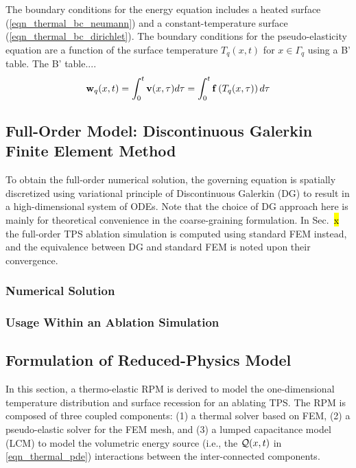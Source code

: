 The boundary conditions for the energy equation includes a heated surface (\cref{eqn_thermal_bc_neumann}) and a constant-temperature surface (\cref{eqn_thermal_bc_dirichlet}). The boundary conditions for the pseudo-elasticity equation are a function of the surface temperature $T_q(x,t)$ for $x\in\Gamma_q$ using a B' table. The B' table....
\begin{equation}
    \mathbf{w}_q(x,t) = \int_{0}^{t} \mathbf{v}(x,\tau)d\tau = \int_{0}^{t}\mathbf{f}\left(T_q(x,\tau)\right)d\tau
\end{equation}


\subsection{Full-Order Model: Discontinuous Galerkin Finite Element Method}

To obtain the full-order numerical solution, the governing equation is spatially discretized using variational principle of Discontinuous Galerkin (DG) to result in a high-dimensional system of ODEs. Note that the choice of DG approach here is mainly for theoretical convenience in the coarse-graining formulation. In Sec.~\hl{x} the full-order TPS ablation simulation is computed using standard FEM instead, and the equivalence between DG and standard FEM is noted upon their convergence.

\subsubsection{Numerical Solution}

\subsubsection{Usage Within an Ablation Simulation}


\subsection{Formulation of Reduced-Physics Model}

In this section, a thermo-elastic RPM is derived to model the one-dimensional temperature distribution and surface recession for an ablating TPS. The RPM is composed of three coupled components: (1) a thermal solver based on FEM, (2) a pseudo-elastic solver for the FEM mesh, and (3) a lumped capacitance model (LCM) to model the volumetric energy source (i.e., the $\mathcal{Q}(x,t)$ in \cref{eqn_thermal_pde}) interactions between the inter-connected components.

